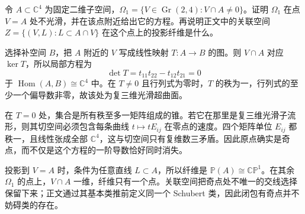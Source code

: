 \begin{exercise}\label{g2:ex:schubert-divisor-singularity}
	令 \(A\subset\mathbb C^4\) 为固定二维子空间，\(\Omega_1=\{V\in\operatorname{Gr}(2,4):V\cap A\ne0\}\)。证明 \(\Omega_1\) 在点 \(V=A\) 处不光滑，并在该点附近给出它的方程。再说明正文中的关联空间 \(Z=\{(V,L):L\subset A\cap V\}\) 在这个点上的投影纤维是什么。
\end{exercise}
\begin{solution}
	选择补空间 \(B\)，把 \(A\) 附近的 \(V\) 写成线性映射 \(T:A\to B\) 的图。则 \(V\cap A\) 对应 \(\ker T\)，所以局部方程为
	\[
		\det T=t_{11}t_{22}-t_{12}t_{21}=0
	\]
	于 \(\operatorname{Hom}(A,B)\cong\mathbb C^4\) 中。在 \(T\ne0\) 且行列式为零时，\(T\) 的秩为一，行列式的至少一个偏导数非零，故该处为复三维光滑超曲面。

	在 \(T=0\) 处，集合是所有秩至多一矩阵组成的锥。若它在那里是复三维光滑子流形，则其切空间必须包含每条曲线 \(t\mapsto tE_{ij}\) 在零点的速度。四个矩阵单位 \(E_{ij}\) 都秩一，且线性张成全部 \(\mathbb C^4\)，这与切空间只有复维数三矛盾。因此原点确实是奇点，而不仅是这个方程的一阶导数恰好同时消失。

	投影到 \(V=A\) 时，条件为任意直线 \(L\subset A\)，所以纤维是 \(\mathbb P(A)\cong\mathbb{CP}^1\)。在其余 \(\Omega_1\) 的点上，\(V\cap A\) 一维，纤维只有一个点。关联空间把奇点处不唯一的交线选择保留下来；正文通过其基本类推前定义同一个 Schubert 类，因此闭包有奇点并不妨碍类的存在。
\end{solution}


